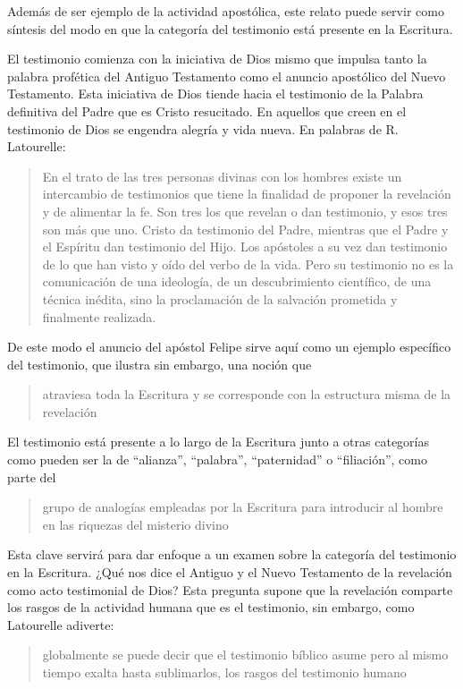 Además de ser ejemplo de la actividad apostólica, este relato puede servir como
síntesis del modo en que la categoría del testimonio está presente en la
Escritura.

El testimonio comienza con la iniciativa de Dios mismo que impulsa tanto la
palabra profética del Antiguo Testamento como el anuncio apostólico del Nuevo
Testamento. Esta iniciativa de Dios tiende hacia el testimonio de la Palabra
definitiva del Padre que es Cristo resucitado. En aquellos que creen en el
testimonio de Dios se engendra alegría y vida nueva. En palabras de R.
Latourelle:

\blockquote[{\cite[1531]{latourelle2000testimonio}}]{En el trato de las tres
  personas divinas con los hombres existe un intercambio de testimonios que
  tiene la finalidad de proponer la revelación y de alimentar la fe. Son tres
  los que revelan o dan testimonio, y esos tres son más que uno. Cristo da
  testimonio del Padre, mientras que el Padre y el Espíritu dan testimonio del
  Hijo. Los apóstoles a su vez dan testimonio de lo que han visto y oído del
  verbo de la vida. Pero su testimonio no es la comunicación de una ideología,
  de un descubrimiento científico, de una técnica inédita, sino la proclamación
  de la salvación prometida y finalmente realizada.}

De este modo el anuncio del apóstol Felipe sirve aquí como un ejemplo específico
del testimonio, que ilustra sin embargo, una noción que
\blockquote[{\cite[109]{prades2015testimonio}}]{atraviesa toda la Escritura y se
  corresponde con la estructura misma de la revelación}. El testimonio está
presente a lo largo de la Escritura junto a otras categorías como pueden ser la
de \enquote{alianza}, \enquote{palabra}, \enquote{paternidad} o
\enquote{filiación}, como parte del
\blockquote[{\cite[1523]{latourelle2000testimonio}}]{grupo de analogías
  empleadas por la Escritura para introducir al hombre en las riquezas del
  misterio divino}.

Esta clave servirá para dar enfoque a un examen sobre la categoría del
testimonio en la Escritura. ¿Qué nos dice el Antiguo y el Nuevo Testamento de la
revelación como acto testimonial de Dios? Esta pregunta supone que la revelación
comparte los rasgos de la actividad humana que es el testimonio, sin embargo,
como Latourelle adiverte:
\blockquote[{\cite[1526]{latourelle2000testimonio}}]{globalmente se puede decir
  que el testimonio bíblico asume pero al mismo tiempo exalta hasta sublimarlos,
  los rasgos del testimonio humano}.

